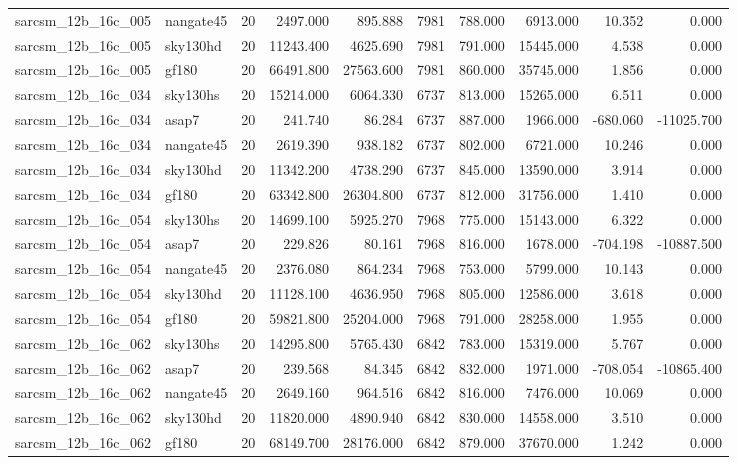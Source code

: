 \begin{longtable}{llrrrrrrrr}
sarcsm\_12b\_16c\_005 & nangate45 & 20 & 2497.000 & 895.888 & 7981 & 788.000 & 6913.000 & 10.352 & 0.000 \\
sarcsm\_12b\_16c\_005 & sky130hd & 20 & 11243.400 & 4625.690 & 7981 & 791.000 & 15445.000 & 4.538 & 0.000 \\
sarcsm\_12b\_16c\_005 & gf180 & 20 & 66491.800 & 27563.600 & 7981 & 860.000 & 35745.000 & 1.856 & 0.000 \\
sarcsm\_12b\_16c\_034 & sky130hs & 20 & 15214.000 & 6064.330 & 6737 & 813.000 & 15265.000 & 6.511 & 0.000 \\
sarcsm\_12b\_16c\_034 & asap7 & 20 & 241.740 & 86.284 & 6737 & 887.000 & 1966.000 & -680.060 & -11025.700 \\
sarcsm\_12b\_16c\_034 & nangate45 & 20 & 2619.390 & 938.182 & 6737 & 802.000 & 6721.000 & 10.246 & 0.000 \\
sarcsm\_12b\_16c\_034 & sky130hd & 20 & 11342.200 & 4738.290 & 6737 & 845.000 & 13590.000 & 3.914 & 0.000 \\
sarcsm\_12b\_16c\_034 & gf180 & 20 & 63342.800 & 26304.800 & 6737 & 812.000 & 31756.000 & 1.410 & 0.000 \\
sarcsm\_12b\_16c\_054 & sky130hs & 20 & 14699.100 & 5925.270 & 7968 & 775.000 & 15143.000 & 6.322 & 0.000 \\
sarcsm\_12b\_16c\_054 & asap7 & 20 & 229.826 & 80.161 & 7968 & 816.000 & 1678.000 & -704.198 & -10887.500 \\
sarcsm\_12b\_16c\_054 & nangate45 & 20 & 2376.080 & 864.234 & 7968 & 753.000 & 5799.000 & 10.143 & 0.000 \\
sarcsm\_12b\_16c\_054 & sky130hd & 20 & 11128.100 & 4636.950 & 7968 & 805.000 & 12586.000 & 3.618 & 0.000 \\
sarcsm\_12b\_16c\_054 & gf180 & 20 & 59821.800 & 25204.000 & 7968 & 791.000 & 28258.000 & 1.955 & 0.000 \\
sarcsm\_12b\_16c\_062 & sky130hs & 20 & 14295.800 & 5765.430 & 6842 & 783.000 & 15319.000 & 5.767 & 0.000 \\
sarcsm\_12b\_16c\_062 & asap7 & 20 & 239.568 & 84.345 & 6842 & 832.000 & 1971.000 & -708.054 & -10865.400 \\
sarcsm\_12b\_16c\_062 & nangate45 & 20 & 2649.160 & 964.516 & 6842 & 816.000 & 7476.000 & 10.069 & 0.000 \\
sarcsm\_12b\_16c\_062 & sky130hd & 20 & 11820.000 & 4890.940 & 6842 & 830.000 & 14558.000 & 3.510 & 0.000 \\
sarcsm\_12b\_16c\_062 & gf180 & 20 & 68149.700 & 28176.000 & 6842 & 879.000 & 37670.000 & 1.242 & 0.000 \\

\end{longtable}
